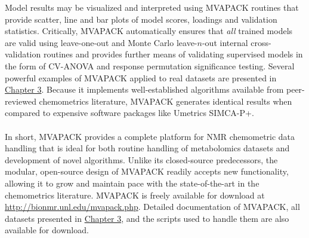 \begin{doublespace}
Model results may be visualized and interpreted using MVAPACK routines that
provide scatter, line and bar plots of model scores, loadings and validation
statistics. Critically, MVAPACK automatically ensures that {\it all} trained
models are valid using leave-one-out and Monte Carlo leave-$n$-out internal
cross-validation routines and provides further means of validating supervised
models in the form of CV-ANOVA and response permutation significance testing.
Several powerful examples of MVAPACK applied to real datasets are presented in
\hyperlink{chapter.3}{Chapter 3}. Because it implements well-established
algorithms available from peer-reviewed chemometrics literature, MVAPACK
generates identical results when compared to expensive software packages
like Umetrics SIMCA-P+.
\\\\
In short, MVAPACK provides a complete platform for NMR chemometric data
handling that is ideal for both routine handling of metabolomics datasets and
development of novel algorithms. Unlike its closed-source predecessors, the
modular, open-source design of MVAPACK readily accepts new functionality,
allowing it to grow and maintain pace with the state-of-the-art in the
chemometrics literature. MVAPACK is freely available for download at
\url{http://bionmr.unl.edu/mvapack.php}. Detailed documentation of MVAPACK,
all datasets presented in \hyperlink{chapter.3}{Chapter 3}, and the scripts
used to handle them are also available for download.
\end{doublespace}




